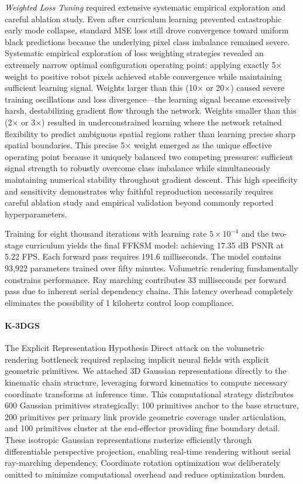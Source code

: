 ﻿\documentclass[11pt,a4paper]{article}
\begin{document}
\emph{Weighted Loss Tuning} required extensive systematic empirical exploration and careful ablation study. Even after curriculum learning prevented catastrophic early mode collapse, standard MSE loss still drove convergence toward uniform black predictions because the underlying pixel class imbalance remained severe. Systematic empirical exploration of loss weighting strategies revealed an extremely narrow optimal configuration operating point: applying exactly 5× weight to positive robot pixels achieved stable convergence while maintaining sufficient learning signal. Weights larger than this (10× or 20×) caused severe training oscillations and loss divergence—the learning signal became excessively harsh, destabilizing gradient flow through the network. Weights smaller than this (2× or 3×) resulted in underconstrained learning where the network retained flexibility to predict ambiguous spatial regions rather than learning precise sharp spatial boundaries. This precise 5× weight emerged as the unique effective operating point because it uniquely balanced two competing pressures: sufficient signal strength to robustly overcome class imbalance while simultaneously maintaining numerical stability throughout gradient descent. This high specificity and sensitivity demonstrates why faithful reproduction necessarily requires careful ablation study and empirical validation beyond commonly reported hyperparameters.

Training for eight thousand iterations with learning rate $5 \times 10^{-4}$ and the two-stage curriculum yields the final FFKSM model: achieving 17.35 dB PSNR at 5.22 FPS. Each forward pass requires 191.6 milliseconds. The model contains 93,922 parameters trained over fifty minutes. Volumetric rendering fundamentally constrains performance. Ray marching contributes 33 milliseconds per forward pass due to inherent serial dependency chains. This latency overhead completely eliminates the possibility of 1 kilohertz control loop compliance.

\paragraph{K-3DGS} The Explicit Representation Hypothesis
Direct attack on the volumetric rendering bottleneck required replacing implicit neural fields with explicit geometric primitives. We attached 3D Gaussian representations directly to the kinematic chain structure, leveraging forward kinematics to compute necessary coordinate transforms at inference time. This computational strategy distributes 600 Gaussian primitives strategically: 100 primitives anchor to the base structure, 200 primitives per primary link provide geometric coverage under articulation, and 100 primitives cluster at the end-effector providing fine boundary detail. These isotropic Gaussian representations rasterize efficiently through differentiable perspective projection, enabling real-time rendering without serial ray-marching dependency. Coordinate rotation optimization was deliberately omitted to minimize computational overhead and reduce optimization burden.
\end{document}
